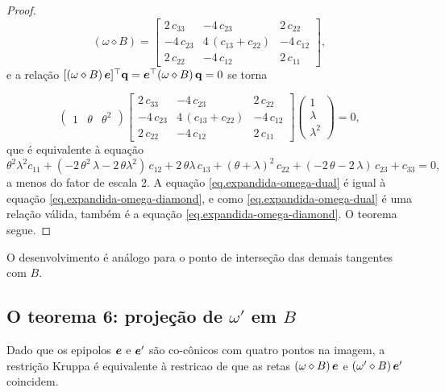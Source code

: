 \begin{proof}
\begin{equation*}
(\omega\diamond B)=
\begin{bmatrix}
2\,c_{33}&-4\,c_{23}&2\,c_{22}\\
-4\,c_{23}&4\,(c_{13}+c_{22})&-4\,c_{12}\\
2\,c_{22}&-4\,c_{12}&2\,c_{11}
\end{bmatrix},
\end{equation*}
e a relação $[(\omega\diamond B)\,\boldsymbol{e}]^\top {\bf q}=\boldsymbol{e}^\top (\omega\diamond B)\,{\bf q}=0$ se torna

\begin{equation*}
\begin{pmatrix}
1&\theta&\theta^2
\end{pmatrix}
\begin{bmatrix}
2\,c_{33}&-4\,c_{23}&2\,c_{22}\\
-4\,c_{23}&4\,(c_{13}+c_{22})&-4\,c_{12}\\
2\,c_{22}&-4\,c_{12}&2\,c_{11}
\end{bmatrix}
\begin{pmatrix}
1\\
\lambda\\
\lambda^2
\end{pmatrix}
=0,
\end{equation*}
que é equivalente à equação
\begin{equation}\label{eq.expandida-omega-diamond}
\theta^2\lambda^2 c_{11}+(-2\,\theta^2\,\lambda-2\,\theta\lambda^2)\,c_{12}+2\,\theta\lambda\,c_{13}+(\theta+\lambda)^2\,c_{22}+(-2\,\theta-2\,\lambda)\,c_{23}+c_{33}=0,
\end{equation}
a menos do fator de escala 2. A equação \ref{eq.expandida-omega-dual} é igual à equação \ref{eq.expandida-omega-diamond}, e como 
\ref{eq.expandida-omega-dual} é uma relação válida, também é a equação \ref{eq.expandida-omega-diamond}. O teorema segue.
\end{proof}
O desenvolvimento é análogo para o ponto de interseção das demais tangentes com $B$.


\subsection{O teorema 6: projeção de $\omega'$ em $B$}\label{sec.teorema-6}

\begin{teorema}
Dado que os epipolos $\boldsymbol{e}$ e $\boldsymbol{e}'$ são co-cônicos com quatro pontos na imagem, a restrição Kruppa é equivalente à restricao de que as retas $(\omega\diamond B)\,\boldsymbol{e}$ e $(\omega'\diamond B)\,\boldsymbol{e}'$ coincidem.
\end{teorema}

